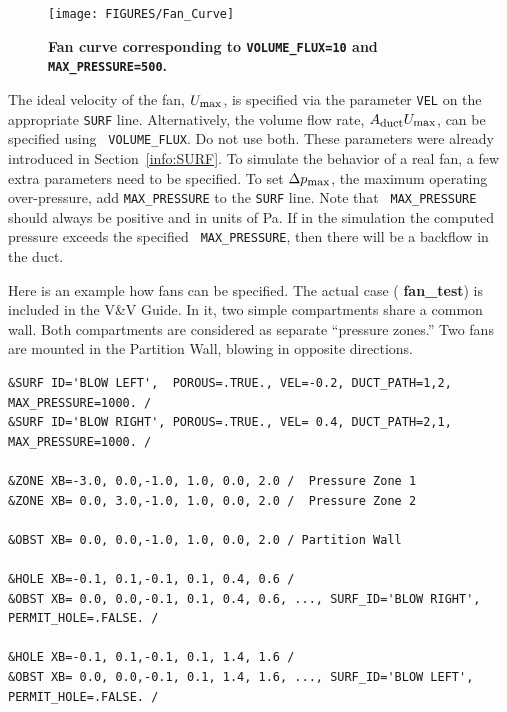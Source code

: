 \documentclass[11pt]{book}
\newcommand{\ct}{\tt\small}
\begin{document}
\begin{figure}[ht!]
\begin{center}
\texttt{[image: FIGURES/Fan\_Curve]}
\caption{\bf Fan curve corresponding to {\ct VOLUME\_FLUX=10} and {\ct MAX\_PRESSURE=500}.}
\label{fig:Fan_Curve}
\end{center}
\end{figure}

The ideal velocity of the fan, $U_{\hbox{\footnotesize max}}$, is
specified via the parameter {\ct VEL} on the appropriate {\ct SURF}
line. Alternatively, the volume flow rate, $A_{\hbox{\footnotesize
duct}} U_{\hbox{\footnotesize max}}$, can be specified using {\ct
VOLUME\_FLUX}. Do not use both.  These parameters were already
introduced in Section~\ref{info:SURF}. To simulate the behavior of a
real fan, a few extra parameters need to be specified. To set $\Delta
p_{\hbox{\footnotesize max}}$, the maximum operating over-pressure,
add {\ct MAX\_PRESSURE} to the {\ct SURF} line. Note that {\ct
MAX\_PRESSURE} should always be positive and in units of Pa.  If in
the simulation the computed pressure exceeds the specified {\ct
MAX\_PRESSURE}, then there will be a backflow in the duct.

Here is an example how fans can be specified. The actual case ({\bf
fan\_test}) is included in the V\&V Guide. In it, two simple
compartments share a common wall. Both compartments are considered as
separate ``pressure zones.'' Two fans are mounted in the Partition
Wall, blowing in opposite directions.

\footnotesize
\begin{verbatim}
&SURF ID='BLOW LEFT',  POROUS=.TRUE., VEL=-0.2, DUCT_PATH=1,2, MAX_PRESSURE=1000. /
&SURF ID='BLOW RIGHT', POROUS=.TRUE., VEL= 0.4, DUCT_PATH=2,1, MAX_PRESSURE=1000. /

&ZONE XB=-3.0, 0.0,-1.0, 1.0, 0.0, 2.0 /  Pressure Zone 1
&ZONE XB= 0.0, 3.0,-1.0, 1.0, 0.0, 2.0 /  Pressure Zone 2

&OBST XB= 0.0, 0.0,-1.0, 1.0, 0.0, 2.0 / Partition Wall

&HOLE XB=-0.1, 0.1,-0.1, 0.1, 0.4, 0.6 /
&OBST XB= 0.0, 0.0,-0.1, 0.1, 0.4, 0.6, ..., SURF_ID='BLOW RIGHT', PERMIT_HOLE=.FALSE. /

&HOLE XB=-0.1, 0.1,-0.1, 0.1, 1.4, 1.6 /
&OBST XB= 0.0, 0.0,-0.1, 0.1, 1.4, 1.6, ..., SURF_ID='BLOW LEFT', PERMIT_HOLE=.FALSE. /
\end{verbatim}
\normalsize
\end{document}
